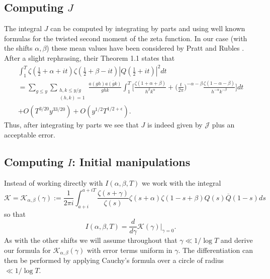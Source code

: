 \documentclass[oneside, 12pt]{amsart}
\theoremstyle{definition}
\newcommand{\mc}{\mathcal}
\newcommand{\ol}{\overline}
\newcommand{\leqs}{\leqslant }
\newcommand{\ben}{\begin{equation}}
\newcommand{\een}{\end{equation} }
\begin{document}
\subsection{Computing $J$}


The integral $J$ can be computed by integrating by parts and using well known formulas for the twisted second moment of the zeta function. In our case (with the shifts $\alpha,\beta$) these mean values have been considered by Pratt and Rubles \cite{PR}. After a slight rephrasing, their Theorem 1.1 states that
\begin{multline*}
        \int_{1}^{T} \zeta(\tfrac{1}{2}+\alpha+it)\zeta(\tfrac{1}{2}+\beta-it)|Q(\tfrac{1}{2}+it)|^2dt
 \\   = \sum_{g\leqs y}\sum_{\substack{h,k\leqs y/g\\(h,k)=1}}\frac{a(gh)\overline{a(gk)}}{g{hk}}
         \int_1^T 
         \bigg[
                 \frac{\zeta(1+\alpha+\beta)}{h^{\beta}k^{\alpha}}
              + \bigg(\frac{t}{2\pi}\bigg)^{-\alpha-\beta}
                 \frac{\zeta(1-\alpha-\beta)}{h^{-\alpha}k^{-\beta}}
         \bigg]dt
 \\     +O(T^{3/20}y^{33/20})+O(y^{1/2}T^{1/2+\epsilon}).
\end{multline*} 
Thus, after integrating by parts we see that $J$ is indeed given by $\mc{J}$ plus an acceptable error. 

\subsection{Computing $I$: Initial manipulations}
Instead of working directly with $I(\alpha,\beta,T)$ we work with  the integral 
\ben
\label{mc K}
\mc{K}=\mc{K}_{\alpha,\beta}(\gamma):=
\frac{1}{2\pi i}\int_{a+i}^{a+iT} \frac{\zeta(s+\gamma)}{\zeta(s)}\zeta(s+\alpha)\zeta(1-s+\beta)Q(s)\ol{Q}(1-s)ds
\een
so that 
\[
I(\alpha,\beta,T)=\frac{d}{d\gamma}\mc{K}(\gamma)\bigg|_{\gamma=0}.
\]
As with the other shifts we will assume throughout that $\gamma\ll1/\log T$ and derive our formula for $\mc{K}_{\alpha,\beta}(\gamma)$ with error terms uniform in $\gamma$. The differentiation can then be performed by applying Cauchy's formula over a circle of radius $\ll1/
\log T$. 
\end{document}
